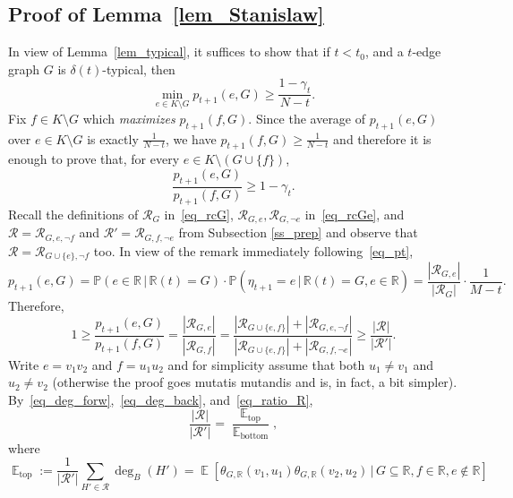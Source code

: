 \documentclass[12pt,reqno]{amsart}
\newcommand{\E}{\operatorname{\mathbb{E}}}
\newcommand{\rc}{{\mathcal{R}}}
\newcommand{\Prob} {\mathbb {P}}
\newcommand{\prob}[1]{\Prob\left(#1\right)}
\newcommand{\Pc}[2]{\prob{#1\,|\,#2}}
\newcommand{\Ec}[2]{\E\left[#1\,|\,#2\right]}
\newcommand{\R} {\mathbb R}
\theoremstyle{definition}
\newcommand{\deltat}{\delta(t)}
\begin{document}
\subsection{Proof of Lemma~\ref{lem_Stanislaw}}
\label{ss_Stanislaw_proof}
In view of Lemma~\ref{lem_typical}, it suffices to show that if $t < t_0$, and  a $t$-edge graph $G$ is $\deltat$-typical, then
\begin{equation*}
	\min_{e \in K \setminus G}p_{t+1}(e,G) \ge \frac{1 - \gamma_t}{N - t}.
\end{equation*}
Fix $f \in K \setminus G$ which \emph{maximizes} $p_{t+1}(f,G)$.
Since the average of
$p_{t+1}(e,G)$ over $e \in K \setminus G$ is exactly $\frac{1}{N - t}$, we have
$p_{t+1}(f,G) \ge \frac{1}{N - t}$
and therefore it is enough to prove that, for every $e \in K \setminus (G \cup \{f\})$,
\begin{equation*}
\frac{p_{t+1}(e,G)}{p_{t+1}(f,G)}
	\ge 1 - \gamma_t.
\end{equation*}
Recall the definitions of $\rc_G$ in~\eqref{eq_rcG}, $\rc_{G,e}, \rc_{G, \neg e}$ in~\eqref{eq_rcGe}, and $\rc = \rc_{G,e,\neg f}$ and $\rc' = \rc_{G, f, \neg e}$ from Subsection \ref{ss_prep}
and observe that $\rc = \rc_{G\cup \{e\},\neg f}$ too. In view of the remark immediately following~\eqref{eq_pt},
\begin{equation*}
  p_{t+1}(e,G) = \Pc{e \in \R}{\R(t) = G} \cdot \Pc{\eta_{t+1} = e}{\R(t) = G, e \in \R} = \frac{|\rc_{G,e}|}{|\rc_G|} \cdot \frac{1}{M-t}.
\end{equation*}
Therefore,
\begin{equation*}
  \label{eq_ratio}
	1 \ge \frac{p_{t+1}(e,G)}{p_{t+1}(f,G)}
	= \frac{|\rc_{G,e}|}{|\rc_{G,f}|}
	= \frac{|\rc_{G \cup \{e,f\}}| + |\rc_{G,e,\neg f}|}{|\rc_{G \cup \{e, f\}}| + |\rc_{G,f,\neg e}| } \ge \frac{|\rc|}{|\rc'|}.
\end{equation*}
Write $e = v_1v_2$ and $f = u_1u_2$ and for simplicity assume that both $u_1 \neq v_1$ and $u_2 \neq v_2$ (otherwise the proof goes mutatis mutandis and is, in fact, a bit simpler).
By~\eqref{eq_deg_forw},~\eqref{eq_deg_back}, and~\eqref{eq_ratio_R},
\begin{equation*}
	\frac{|\rc|}{|\rc'|} = \frac{\E_{\text{top}}}{\E_{\text{bottom}}},
\end{equation*}
where
\begin{equation*}
	\E_{\text{top}} := \frac1{|\rc'|}\sum_{H'\in\rc}\deg_B(H')= \Ec{\theta_{G,\R}(v_1,u_1)\theta_{G,\R}(v_2,u_2)}{G \subseteq \R, f \in \R, e \notin \R}
\end{equation*}
\end{document}
